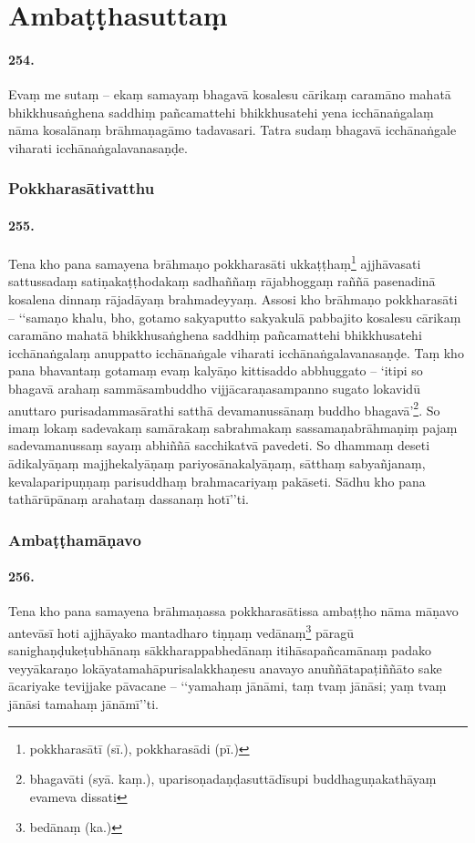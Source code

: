 \section{Ambaṭṭhasuttaṃ}

\paragraph{254.} Evaṃ me sutaṃ – ekaṃ samayaṃ bhagavā kosalesu cārikaṃ caramāno mahatā bhikkhusaṅghena saddhiṃ pañcamattehi bhikkhusatehi yena icchānaṅgalaṃ nāma kosalānaṃ brāhmaṇagāmo tadavasari. Tatra sudaṃ bhagavā icchānaṅgale viharati icchānaṅgalavanasaṇḍe.

\subsubsection{Pokkharasātivatthu}

\paragraph{255.} Tena kho pana samayena brāhmaṇo pokkharasāti ukkaṭṭhaṃ\footnote{pokkharasātī (sī.), pokkharasādi (pī.)} ajjhāvasati sattussadaṃ satiṇakaṭṭhodakaṃ sadhaññaṃ rājabhoggaṃ raññā pasenadinā kosalena dinnaṃ rājadāyaṃ brahmadeyyaṃ. Assosi kho brāhmaṇo pokkharasāti – ‘‘samaṇo khalu, bho, gotamo sakyaputto sakyakulā pabbajito kosalesu cārikaṃ caramāno mahatā bhikkhusaṅghena saddhiṃ pañcamattehi bhikkhusatehi icchānaṅgalaṃ anuppatto icchānaṅgale viharati icchānaṅgalavanasaṇḍe. Taṃ kho pana bhavantaṃ gotamaṃ evaṃ kalyāṇo kittisaddo abbhuggato – ‘itipi so bhagavā arahaṃ sammāsambuddho vijjācaraṇasampanno sugato lokavidū anuttaro purisadammasārathi satthā devamanussānaṃ buddho bhagavā’\footnote{bhagavāti (syā. kaṃ.), uparisoṇadaṇḍasuttādīsupi buddhaguṇakathāyaṃ evameva dissati}. So imaṃ lokaṃ sadevakaṃ samārakaṃ sabrahmakaṃ sassamaṇabrāhmaṇiṃ pajaṃ sadevamanussaṃ sayaṃ abhiññā sacchikatvā pavedeti. So dhammaṃ deseti ādikalyāṇaṃ majjhekalyāṇaṃ pariyosānakalyāṇaṃ, sātthaṃ sabyañjanaṃ, kevalaparipuṇṇaṃ parisuddhaṃ brahmacariyaṃ pakāseti. Sādhu kho pana tathārūpānaṃ arahataṃ dassanaṃ hotī’’ti.

\subsubsection{Ambaṭṭhamāṇavo}

\paragraph{256.} Tena kho pana samayena brāhmaṇassa pokkharasātissa ambaṭṭho nāma māṇavo antevāsī hoti ajjhāyako mantadharo tiṇṇaṃ vedānaṃ\footnote{bedānaṃ (ka.)} pāragū sanighaṇḍukeṭubhānaṃ sākkharappabhedānaṃ itihāsapañcamānaṃ padako veyyākaraṇo lokāyatamahāpurisalakkhaṇesu anavayo anuññātapaṭiññāto sake ācariyake tevijjake pāvacane – ‘‘yamahaṃ jānāmi, taṃ tvaṃ jānāsi; yaṃ tvaṃ jānāsi tamahaṃ jānāmī’’ti.

